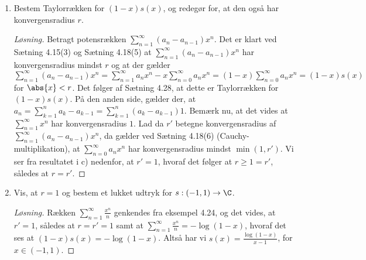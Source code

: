 \begin{opg}
\begin{enumerate}
\begin{proof}[Løsning]
    \end{proof}
    \fi
    \item Bestem Taylorr\ae{}kken for $ (1-x)s(x) $, og redegør for, at den også har konvergensradius $ r $.
    \ifanswers
    \begin{proof}[Løsning]
    	Betragt potensrækken $ \sum_{n=1}^{\infty}(a_n-a_{n-1})x^n $. Det er klart ved Sætning 4.15(3) og Sætning 4.18(5) at $ \sum_{n=1}^{\infty}(a_n-a_{n-1})x^n $ har konvergensradius mindst $ r $ og at der gælder $ \sum_{n=1}^{\infty}(a_n-a_{n-1})x^n=\sum_{n=1}^{\infty}a_nx^n-x\sum_{n=0}^{\infty}a_nx^n=(1-x)\sum_{n=0}^{\infty}a_nx^n=(1-x)s(x) $ for $ \abs{x}< r $. Det følger af Sætning 4.28, at dette er Taylorrækken for $ (1-x)s(x) $. På den anden side, gælder der, at $ a_n=\sum_{k=1}^{n}a_k-a_{k-1}=\sum_{k=1}^{n}(a_k-a_{k-1})1 $. Bemærk nu, at det vides at $ \sum_{n=1}^{\infty}x^n $ har konvergensradius $ 1 $. Lad da $ r' $ betegne konvergensradius af $ \sum_{n=1}^{\infty}(a_n-a_{n-1})x^n $, da gælder ved Sætning 4.18(6) (Cauchy-multiplikation), at $ \sum_{n=0}^{\infty}a_nx^n $ har konvergensradius mindst $ \min(1,r') $. Vi ser fra resultatet i c) nedenfor, at $ r'=1 $, hvoraf det følger at $ r\geq 1=r' $, således at $ r=r' $.
    \end{proof}
    \fi 
    \item Vis, at $ r=1 $ og bestem et lukket udtryk for $ s:(-1,1)\to \C $.
    \ifanswers
    \begin{proof}[Løsning]
     Rækken $ \sum_{n=1}^{\infty}\frac{x^n}{n} $ genkendes fra eksempel 4.24, og det vides, at $ r'=1 $, således at $ r=r'=1 $ samt at $ \sum_{n=1}^{\infty}\frac{x^n}{n}=-\log(1-x) $, hvoraf det ses at $ (1-x)s(x)=-\log(1-x) $. Altså har vi $ s(x)=\frac{\log(1-x)}{x-1} $, for $ x\in(-1,1) $.
    \end{proof}
    \fi
\end{enumerate}
\end{opg}

